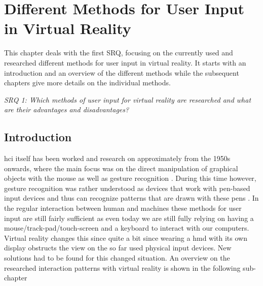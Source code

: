 
\section{Different Methods for User Input in Virtual Reality}

\label{SectionLiteratureReviewSRQ1}

This chapter deals with the first SRQ, focusing on the currently used and researched different methods for user input in virtual reality. It starts with an introduction and an overview of the different methods while the subsequent chapters give more details on the individual methods.
\begin{framed}
	\textit{SRQ 1: Which methods of user input for virtual reality are researched and what are their advantages and disadvantages?}
\end{framed}

\subsection{Introduction}

\gls{hci} itself has been worked and research on approximately from the 1950s onwards, where the main focus was on the direct manipulation of graphical objects with the mouse as well as gesture recognition \citep{Myers1998}. During this time however, gesture recognition was rather understood as devices that work with pen-based input devices and thus can recognize patterns that are drawn with these pens \citep{Myers1998}. In the regular interaction between human and machines these methods for user input are still fairly sufficient as even today we are still fully relying on having a mouse/track-pad/touch-screen and a keyboard to interact with our computers. \newline
Virtual reality changes this since quite a bit since wearing a \gls{hmd} with its own display obstructs the view on the so far used physical input devices. New solutions had to be found for this changed situation. An overview on the researched interaction patterns with virtual reality is shown in the following sub-chapter



